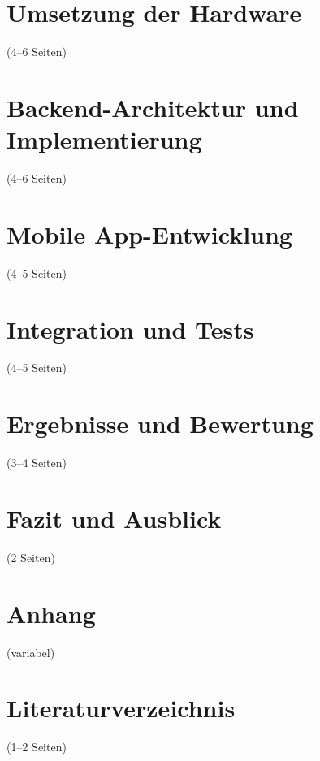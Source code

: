 \documentclass[a4paper, 12pt]{IEEEconf} %
\begin{document}
\section{Umsetzung der Hardware}(4–6 Seiten)
    
\newpage

\section{Backend-Architektur und Implementierung}(4–6 Seiten)
    
\newpage

\section{Mobile App-Entwicklung}(4–5 Seiten)
    
\newpage

\section{Integration und Tests}(4–5 Seiten)
    
\newpage

\section{Ergebnisse und Bewertung}(3–4 Seiten)

\newpage

\section{Fazit und Ausblick}(2 Seiten)
    
\newpage

\section{Anhang}(variabel)
    
\newpage

\section{Literaturverzeichnis}(1–2 Seiten)
    
\newpage
\end{document}
